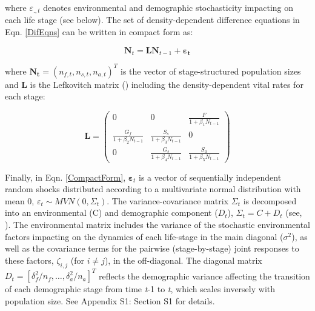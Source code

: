 \documentclass[12pt]{article}
\begin{document}
where $\varepsilon_{.,t}$ denotes environmental and demographic stochasticity impacting on each life stage (see below). The set of density-dependent difference equations in Eqn. \ref{DifEqns} can be written in compact form as:

\begin{equation}\label{CompactForm}
	\mathbf{N}_{t}=\mathbf{L} \mathbf{N}_{t-1} + \boldsymbol{\varepsilon_{t}}
\end{equation}

where $\mathbf{N_{t}} = (n_{f,t}, n_{s,t}, n_{a,t})^T$ is the vector of stage-structured population sizes and $\mathbf{L}$ is the Lefkovitch matrix (\cite{Lefkovitch1965}) including the density-dependent vital rates for each stage:

\begin{equation}\label{DDLefkovitchMatrix}
	\mathbf{L}=\left(\begin{array}{ccc}{0} & {0} & {\frac{F}{1+\beta_{1} N_{ t-1}}} \\
		{\frac{G_{f}}{1+\beta_{2} N_{ t-1}}} & {\frac{S_{s}}{1+\beta_{3} N_{ t-1}}} & {0} \\
		{0} & {\frac{G_{s}}{1+\beta_{4} N_{ t-1}}} & {\frac{S_{a}}{1+\beta_{5} N_{ t-1}}}\end{array}\right)
\end{equation}


Finally, in Eqn. \ref{CompactForm}, $\boldsymbol\varepsilon_{t}$ is a vector of sequentially independent random shocks distributed according to a multivariate normal distribution with mean 0, $\varepsilon_{t} \sim MVN(0, \Sigma_{t})$. The variance-covariance matrix $\Sigma_{t}$ is decomposed into an environmental (C) and demographic component ($D_{t}$), $\Sigma_{t} = C + D_{t}$ (see, \cite{Mutshinda2011,Almaraz2011}). The environmental matrix includes the variance of the stochastic environmental factors impacting on the dynamics of each life-stage in the main diagonal ($\sigma^2$), as well as the covariance terms for the pairwise (stage-by-stage) joint responses to these factors, $\zeta_{i,j}$ (for $i \neq j$), in the off-diagonal. The diagonal matrix $D_{t} = [\delta_{f}^2/n_{f},\ldots, \delta_{a}^2/n_{a}]^T$ reflects the demographic variance affecting the transition of each demographic stage from time \textit{t}-1 to \textit{t}, which scales inversely with population size. See Appendix S1: Section S1 for details.\\
\end{document}
